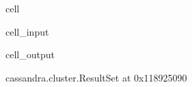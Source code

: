 \documentclass[letterpaper,10pt,english]{jupyterBook}
\begin{document}
\begin{sphinxuseclass}{cell}\begin{sphinxVerbatimInput}

\begin{sphinxuseclass}{cell_input}
\begin{sphinxVerbatim}[commandchars=\\\{\}]
\end{sphinxVerbatim}

\end{sphinxuseclass}\end{sphinxVerbatimInput}
\begin{sphinxVerbatimOutput}

\begin{sphinxuseclass}{cell_output}
\begin{sphinxVerbatim}[commandchars=\\\{\}]
\PYGZlt{}cassandra.cluster.ResultSet at 0x118925090\PYGZgt{}
\end{sphinxVerbatim}

\end{sphinxuseclass}\end{sphinxVerbatimOutput}

\end{sphinxuseclass}
\end{document}
